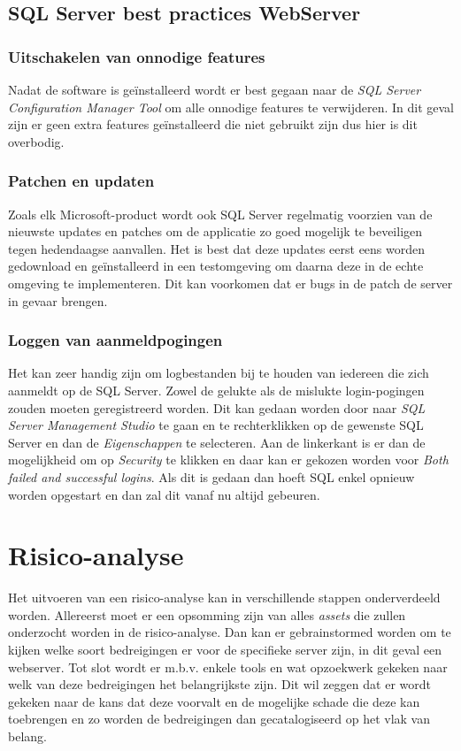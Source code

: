 \documentclass[pdftex,a4paper,12pt]{report}
\begin{document}
\section{SQL Server best practices WebServer}
\subsection{Uitschakelen van onnodige features}
Nadat de software is geïnstalleerd wordt er best gegaan naar de \textit{SQL Server Configuration Manager Tool} om alle onnodige features te verwijderen. In dit geval zijn er geen extra features geïnstalleerd die niet gebruikt zijn dus hier is dit overbodig. \citep{Mam2013}

\subsection{Patchen en updaten}
Zoals elk Microsoft-product wordt ook SQL Server regelmatig voorzien van de nieuwste updates en patches om de applicatie zo goed mogelijk te beveiligen tegen hedendaagse aanvallen. Het is best dat deze updates eerst eens worden gedownload en geïnstalleerd in een testomgeving om daarna deze in de echte omgeving te implementeren. Dit kan voorkomen dat er bugs in de patch de server in gevaar brengen. \citep{Mam2013}

\subsection{Loggen van aanmeldpogingen}
Het kan zeer handig zijn om logbestanden bij te houden van iedereen die zich aanmeldt op de SQL Server. Zowel de gelukte als de mislukte login-pogingen zouden moeten geregistreerd worden. Dit kan gedaan worden door naar \textit{SQL Server Management Studio} te gaan en te rechterklikken op de gewenste SQL Server en dan de \textit{Eigenschappen} te selecteren. Aan de linkerkant is er dan de mogelijkheid om op \textit{Security} te klikken en daar kan er gekozen worden voor \textit{Both failed and successful logins}. Als dit is gedaan dan hoeft SQL enkel opnieuw worden opgestart en dan zal dit vanaf nu altijd gebeuren. \citep{Mam2013}

\chapter{Risico-analyse}
Het uitvoeren van een risico-analyse kan in verschillende stappen onderverdeeld worden. Allereerst moet er een opsomming zijn van alles \textit{assets} die zullen onderzocht worden in de risico-analyse. Dan kan er gebrainstormed worden om te kijken welke soort bedreigingen er voor de specifieke server zijn, in dit geval een webserver. Tot slot wordt er m.b.v. enkele tools en wat opzoekwerk gekeken naar welk van deze bedreigingen het belangrijkste zijn. Dit wil zeggen dat er wordt gekeken naar de kans dat deze voorvalt en de mogelijke schade die deze kan toebrengen en zo worden de bedreigingen dan gecatalogiseerd op het vlak van belang.
\end{document}
